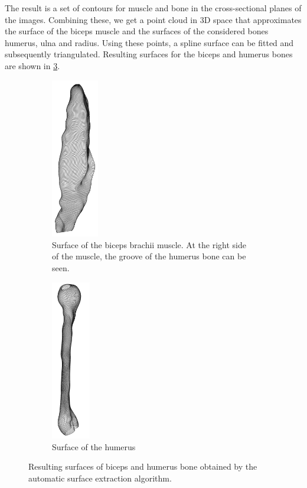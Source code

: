 The result is a set of contours for muscle and bone in the cross-sectional planes of the images. Combining these, we get a point cloud in 3D space that approximates the surface of the biceps muscle and the surfaces of the considered bones humerus, ulna and radius. Using these points, a spline surface can be fitted and subsequently triangulated. Resulting surfaces for the biceps and humerus bones are shown in \cref{fig:extraction_result}.
%
\begin{figure}%
  \centering%
  \begin{subfigure}[t]{0.48\textwidth}%
    \centering%
    \includegraphics[height=7cm]{images/fiber_creation/extraction_biceps.png}%
    \caption{Surface of the biceps brachii muscle. At the right side of the muscle, the groove of the humerus bone can be seen.}%
    \label{fig:extraction_result_biceps}%
  \end{subfigure}
  \begin{subfigure}[t]{0.48\textwidth}%
    \centering%
    \includegraphics[height=7cm]{images/fiber_creation/extraction_humerus00.png}%
    \caption{Surface of the humerus}%
    \label{fig:extraction_result_humerus}%
  \end{subfigure}    
  \caption{Resulting surfaces of biceps and humerus bone obtained by the automatic surface extraction algorithm.}%
  \label{fig:extraction_result}%
\end{figure}%

